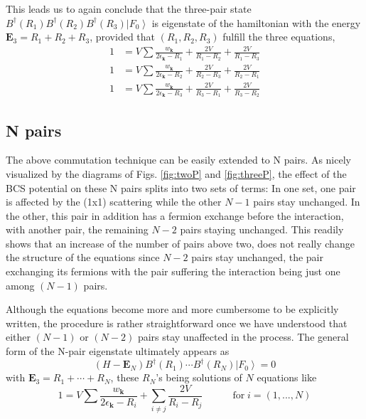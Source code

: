 \documentclass[aps,prb,superscriptaddress,twocolumn]{revtex4}
\begin{document}
This leads us to again conclude that the three-pair state $%
B^{\dagger}(R_1)B^{\dagger}(R_2)B^{\dagger}(R_3)\left|F_0\right>  $ is
eigenstate of the hamiltonian with the energy $\mathbf{E} _3=R_1+R_2+R_3$,
provided that $\left(R_1,R_2, R_3\right) $ fulfill the three equations, 
\begin{equation}
\begin{split}
1&=V\sum\frac{w_{\mathbf{k} }}{2\epsilon_{\mathbf{k} }-R_1}+\frac{2V}{R_1-R_2%
}+\frac{2V}{R_1-R_3} \\
1&=V\sum\frac{w_{\mathbf{k} }}{2\epsilon_{\mathbf{k} }-R_2}+\frac{2V}{R_2-R_3%
}+\frac{2V}{R_2-R_1} \\
1&=V\sum\frac{w_{\mathbf{k} }}{2\epsilon_{\mathbf{k} }-R_3}+\frac{2V}{R_3-R_1%
}+\frac{2V}{R_3-R_2}
\end{split}%
\end{equation}

\subsection{N pairs}

The above commutation technique can be easily extended to N pairs. As nicely
visualized by the diagrams of Figs. \ref{fig:twoP} and \ref{fig:threeP}, the
effect of the BCS potential on these N pairs splits into two sets of terms:
In one set, one pair is affected by the (1x1) scattering while the other $N-1
$ pairs stay unchanged. In the other, this pair in addition has a fermion
exchange before the interaction, with another pair, the remaining $N-2$
pairs staying unchanged. This readily shows that an increase of the number
of pairs above two, does not really change the structure of the equations
since $N-2$ pairs stay unchanged, the pair exchanging its fermions with the
pair suffering the interaction being just one among $(N-1)$ pairs.

Although the equations become more and more cumbersome to be explicitly
written, the procedure is rather straightforward once we have understood
that either $(N-1)$ or $(N-2)$ pairs stay unaffected in the process. The
general form of the N-pair eigenstate ultimately appears as 
\begin{equation}  \label{eq:SchThreeN}
(H-\mathbf{E} _N)B^{\dagger}(R_1)\cdots{}B^{\dagger}(R_N)\left|F_0\right>  =0
\end{equation}
with $\mathbf{E} _3=R_1+\cdots+R_N$, these $R_N$'s being solutions of $N$
equations like 
\begin{equation}
1=V\sum\frac{w_{\mathbf{k} }}{2\epsilon_{\mathbf{k} }-R_i}+\sum_{i\neq{j}}%
\frac{2V}{R_i-R_j}\quad\qquad \text{for}\; i=\left(1,...,N\right) 
\end{equation}
\end{document}
